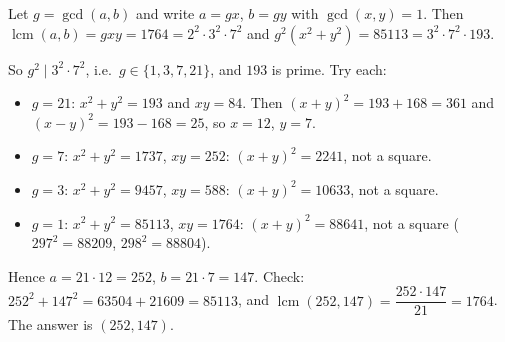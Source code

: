 Let $g=\gcd(a,b)$ and write $a=gx$, $b=gy$ with $\gcd(x,y)=1$. Then $\operatorname{lcm}(a,b)=gxy=1764=2^2\cdot3^2\cdot7^2$ and $g^2(x^2+y^2)=85113=3^2\cdot7^2\cdot193$.

So $g^2\mid3^2\cdot7^2$, i.e.\ $g\in\{1,3,7,21\}$, and $193$ is prime. Try each:
\begin{itemize}
\item $g=21$: $x^2+y^2=193$ and $xy=84$. Then $(x+y)^2=193+168=361$ and $(x-y)^2=193-168=25$, so $x=12$, $y=7$.
\item $g=7$: $x^2+y^2=1737$, $xy=252$: $(x+y)^2=2241$, not a square.
\item $g=3$: $x^2+y^2=9457$, $xy=588$: $(x+y)^2=10633$, not a square.
\item $g=1$: $x^2+y^2=85113$, $xy=1764$: $(x+y)^2=88641$, not a square ($297^2=88209$, $298^2=88804$).
\end{itemize}
Hence $a=21\cdot12=252$, $b=21\cdot7=147$. Check: $252^2+147^2=63504+21609=85113$, and $\operatorname{lcm}(252,147)=\dfrac{252\cdot147}{21}=1764$. The answer is $\boxed{(252,147)}$.
